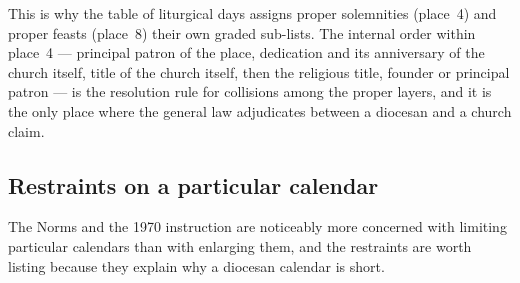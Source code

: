 This is why the table of liturgical days assigns proper solemnities (place~4) and proper feasts
(place~8) their own graded sub-lists. The internal order within place~4 --- principal patron of the
place, dedication and its anniversary of the church itself, title of the church itself, then the
religious title, founder or principal patron --- is the resolution rule for collisions among the
proper layers, and it is the only place where the general law adjudicates between a diocesan and a
church claim.

\subsection{Restraints on a particular calendar}

The Norms and the 1970 instruction are noticeably more concerned with limiting particular calendars
than with enlarging them, and the restraints are worth listing because they explain why a diocesan
calendar is short.

